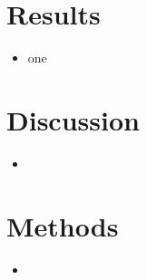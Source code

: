 \documentclass[12pt,one column]{article}
\begin{document}
\section*{Results}
\begin{itemize}
	\item one
\end{itemize}

\section*{Discussion}
\begin{itemize}
	\item
\end{itemize}

\section*{Methods}
\begin{itemize}
	\item
\end{itemize}



\end{document}
